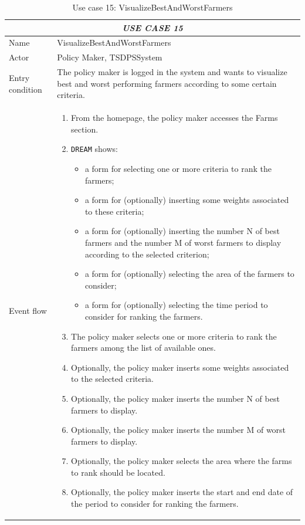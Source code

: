 \documentclass{article}
\begin{document}
\centering
\begin{longtable}{|p{3.5cm}|m{8cm}|}
\caption{Use case 15: VisualizeBestAndWorstFarmers}
 \label{uc15}
 \hline
 \multicolumn{2}{|c|}{\cellcolor{white}\emph{USE CASE 15}} \\
 \endfirsthead
 \endhead
 \endfoot
 \endlastfoot
 \hline
 Name & VisualizeBestAndWorstFarmers\\
 \hline
 Actor & Policy Maker, TSDPSSystem\\
 \hline
 Entry condition & The policy maker is logged in the system and wants to visualize best and worst performing farmers according to some certain criteria.\\
 \hline
 Event flow & \begin{enumerate}
    \item From the homepage, the policy maker accesses the Farms section.
    \item \verb|DREAM| shows:
    \begin{itemize}
        \item a form for selecting one or more criteria to rank the farmers;
        \item a form for (optionally) inserting some weights associated to these criteria;
        \item a form for (optionally) inserting the number N of best farmers and the number M of worst farmers to display according to the selected criterion;
        \item a form for (optionally) selecting the area of the farmers to consider;
        \item a form for (optionally) selecting the time period to consider for ranking the farmers.
    \end{itemize}
    \item The policy maker selects one or more criteria to rank the farmers among the list of available ones.
    \item Optionally, the policy maker inserts some weights associated to the selected criteria.
    \item Optionally, the policy maker inserts the number N of best farmers to display.
    \item Optionally, the policy maker inserts the number M of worst farmers to display.
    \item Optionally, the policy maker selects the area where the farms to rank should be located.
    \item Optionally, the policy maker inserts the start and end date of the period to consider for ranking the farmers.

\end{enumerate}
\end{longtable}
\end{document}
